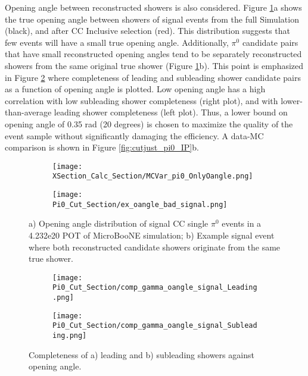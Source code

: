 \par Opening angle between reconstructed showers is also considered. Figure \ref{fig:mcvar_pi0_onlyoangle}a shows the true opening angle between showers of signal events from the full Simulation (black), and after CC Inclusive selection (red). This distribution suggests that few events will have a small true opening angle. Additionally, $\pi^0$ candidate pairs that have small reconstructed opening angles tend to be separately reconstructed showers from the same original true shower (Figure \ref{fig:mcvar_pi0_onlyoangle}b). This point is emphasized in Figure \ref{fig:comp_cutjust_pi0_OA} where completeness of leading and subleading shower candidate pairs as a function of opening angle is plotted. Low opening angle has a high correlation with low subleading shower completeness (right plot), and with lower-than-average leading shower completeness (left plot). Thus, a lower bound on opening angle of 0.35 rad (20 degrees) is chosen to maximize the quality of the event sample without significantly damaging the efficiency. A data-MC comparison is shown in Figure \ref{fig:cutjust_pi0_IP}b. %


\begin{figure}[H]
\centering
  \begin{subfigure}[t]{0.35\textwidth}
    \centering
     \texttt{[image: XSection\_Calc\_Section/MCVar\_pi0\_OnlyOangle.png]}
     \caption{ }
  \end{subfigure} 
  \begin{subfigure}[t]{0.6\textwidth}
    \centering
    \texttt{[image: Pi0\_Cut\_Section/ex\_oangle\_bad\_signal.png]}
    \caption{ }
  \end{subfigure} 
  \caption{ a) Opening angle distribution of signal CC single $\pi^0$ events in a 4.232e20 POT of MicroBooNE simulation; b) Example signal event where both reconstructed candidate showers originate from the same true shower. }
\label{fig:mcvar_pi0_onlyoangle}
\end{figure}

\begin{figure}[H]
\centering
  \begin{subfigure}[t]{0.35\textwidth}
    \centering
\texttt{[image: Pi0\_Cut\_Section/comp\_gamma\_oangle\_signal\_Leading.png]}
  \caption{ }
  \end{subfigure} 
  \hspace{20mm}
  \begin{subfigure}[t]{0.35\textwidth}
    \centering
    \texttt{[image: Pi0\_Cut\_Section/comp\_gamma\_oangle\_signal\_Subleading.png]}
  \caption{ }
  \end{subfigure} 
\caption{ Completeness of a) leading and b) subleading showers against opening angle. }
\label{fig:comp_cutjust_pi0_OA}
\end{figure}

